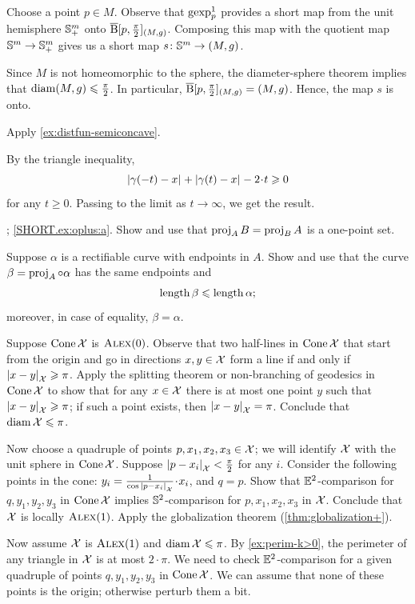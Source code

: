 Choose a point $p\in M$.
Observe that $\operatorname{\rm gexp}\nolimits_p^1$ provides a short map from the unit hemisphere $\mathbb{S}_+^m$ onto $\overline{\mathrm{B}}{}[p,\tfrac\pi2]_{(M,g)}$.
Composing this map with the quotient map $\mathbb{S}^m\to \mathbb{S}_+^m$ gives us a short map $s\:\SSS^m\z\to(M,g)$.

Since $M$ is not homeomorphic to the sphere,
the diameter-sphere theorem implies that $\operatorname{\rm diam}\nolimits (M,g)\leqslant \tfrac\pi2$.
In particular, $\cBall[p,\tfrac\pi2]_{(M,g)}\z=(M,g)$.
Hence, the map $s$ is onto.

Apply \ref{ex:distfun-semiconcave}.

By the triangle inequality,
\[\dist{\gamma(-t)}{x}{}+\dist{\gamma(t)}{x}{}-2\cdot t\ge 0\]
for any $t\ge 0$.
Passing to the limit as $t\to\infty$, we get the result.

\parbf{\ref{ex:oplus}}; \ref{SHORT.ex:oplus:a}.
Show and use that $\operatorname{\rm proj}\nolimits_AB=\operatorname{\rm proj}\nolimits_BA$ is a one-point set.

Suppose $\alpha$ is a rectifiable curve with endpoints in $A$.
Show and use that the curve $\beta=\operatorname{\rm proj}\nolimits_A\circ\alpha$ has the same endpoints and
\[\mathop{\rm length}\nolimits\beta\leqslant \mathop{\rm length}\nolimits\alpha;\]
moreover, in case of equality, $\beta=\alpha$.

Suppose $\mathop{\rm Cone}\nolimits\mathcal{X}$ is $\textup{\textsc{Alex}}(0)$.
Observe that two half-lines in $\mathop{\rm Cone}\nolimits\mathcal{X}$ that start from the origin and go in directions $x,y\in\mathcal{X}$ form a line if and only if $\dist{x}{y}{\spc{X}}\ge \pi$.
Apply the splitting theorem or non-branching of geodesics in $\mathop{\rm Cone}\nolimits\mathcal{X}$ to show that for any $x\in \mathcal{X}$ there is at most one point $y$ such that $\dist{x}{y}{\spc{X}}\ge \pi$; if such a point exists, then
$\dist{x}{y}{\spc{X}}=\pi$.
Conclude that $\diam \spc{X}\z\le \pi$.

Now choose a quadruple of points $p,x_1,x_2,x_3\in \mathcal{X}$;
we will identify $\mathcal{X}$ with the unit sphere in $\mathop{\rm Cone}\nolimits\mathcal{X}$.
Suppose $\dist{p}{x_i}{\spc{X}}<\tfrac\pi2$ for any $i$.
Consider the following points in the cone: $y_i=\tfrac1{\cos \dist{p}{x_i}{\spc{X}}}\cdot x_i$, and $q=p$.
Show that $\mathbb{E}^2$-comparison for $q,y_1,y_2,y_3$ in $\mathop{\rm Cone}\nolimits\mathcal{X}$ implies $\mathbb{S}^2$-comparison for $p,x_1,x_2,x_3$ in $\mathcal{X}$.
Conclude that $\mathcal{X}$ is locally $\textup{\textsc{Alex}}(1)$. 
Apply the globalization theorem (\ref{thm:globalization+}).

Now assume $\mathcal{X}$ is $\textup{\textsc{Alex}}(1)$ and $\operatorname{\rm diam}\nolimits\mathcal{X}\leqslant \pi$.
By \ref{ex:perim-k>0}, the perimeter of any triangle in $\mathcal{X}$ is at most $2\cdot\pi$.
We need to check $\mathbb{E}^2$-comparison for a given quadruple of points $q,y_1,y_2,y_3$ in $\mathop{\rm Cone}\nolimits\mathcal{X}$.
We can assume that none of these points is the origin; otherwise perturb them a bit.

